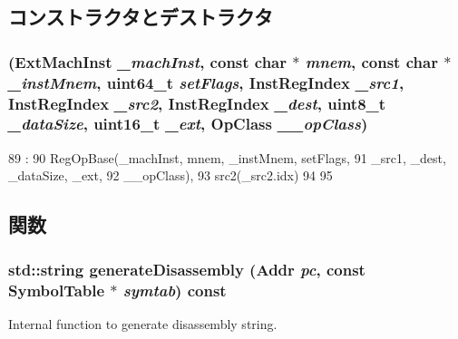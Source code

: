 \subsection{コンストラクタとデストラクタ}
\hypertarget{classX86ISA_1_1RegOp_afe4eb90e103a014d0e48f33fe05d56b6}{
\subsubsection[{RegOp}]{ ({\bf ExtMachInst} {\em \_\-machInst}, \/  const char $\ast$ {\em mnem}, \/  const char $\ast$ {\em \_\-instMnem}, \/  uint64\_\-t {\em setFlags}, \/  {\bf InstRegIndex} {\em \_\-src1}, \/  {\bf InstRegIndex} {\em \_\-src2}, \/  {\bf InstRegIndex} {\em \_\-dest}, \/  uint8\_\-t {\em \_\-dataSize}, \/  uint16\_\-t {\em \_\-ext}, \/  OpClass {\em \_\-\_\-opClass})}}
\label{classX86ISA_1_1RegOp_afe4eb90e103a014d0e48f33fe05d56b6}



\begin{DoxyCode}
89                                    :
90             RegOpBase(_machInst, mnem, _instMnem, setFlags,
91                     _src1, _dest, _dataSize, _ext,
92                     __opClass),
93             src2(_src2.idx)
94         {
95         }

\end{DoxyCode}


\subsection{関数}
\hypertarget{classX86ISA_1_1RegOp_a95d323a22a5f07e14d6b4c9385a91896}{
\subsubsection[{generateDisassembly}]{\setlength{\rightskip}{0pt plus 5cm}std::string generateDisassembly ({\bf Addr} {\em pc}, \/  const {\bf SymbolTable} $\ast$ {\em symtab}) const}}
\label{classX86ISA_1_1RegOp_a95d323a22a5f07e14d6b4c9385a91896}
Internal function to generate disassembly string. 

